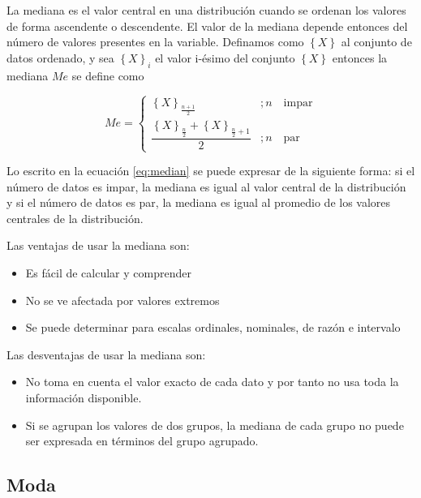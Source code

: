 \documentclass[]{book}
\providecommand{\tightlist}{%
  \setlength{\itemsep}{0pt}\setlength{\parskip}{0pt}}
\begin{document}
La mediana es el valor central en una distribución cuando se ordenan los
valores de forma ascendente o descendente. El valor de la mediana
depende entonces del número de valores presentes en la variable.
Definamos como \(\left\{ X \right \}\) al conjunto de datos ordenado, y
sea \(\left \{ X \right \}_i\) el valor i-ésimo del conjunto
\(\left \{ X \right \}\) entonces la mediana \(Me\) se define como

\begin{equation}
Me = \begin{cases} 
      \left \{ X \right\}_{\frac{n+1}{2}} & ; n \quad \textrm{impar}  \\
      \dfrac{\left \{ X  \right \}_{\frac{n}{2}} + \left \{ X  \right \}_{\frac{n}{2}+1} }{2} & ; n \quad \textrm{par}
   \end{cases}
   \label{eq:median}
\end{equation}

Lo escrito en la ecuación \eqref{eq:median} se puede expresar de la
siguiente forma: si el número de datos es impar, la mediana es igual al
valor central de la distribución y si el número de datos es par, la
mediana es igual al promedio de los valores centrales de la
distribución.

Las ventajas de usar la mediana son:

\begin{itemize}
\tightlist
\item
  Es fácil de calcular y comprender
\item
  No se ve afectada por valores extremos
\item
  Se puede determinar para escalas ordinales, nominales, de razón e
  intervalo
\end{itemize}

Las desventajas de usar la mediana son:

\begin{itemize}
\tightlist
\item
  No toma en cuenta el valor exacto de cada dato y por tanto no usa toda
  la información disponible.
\item
  Si se agrupan los valores de dos grupos, la mediana de cada grupo no
  puede ser expresada en términos del grupo agrupado.
\end{itemize}

\subsection{Moda}\label{moda}
\end{document}
